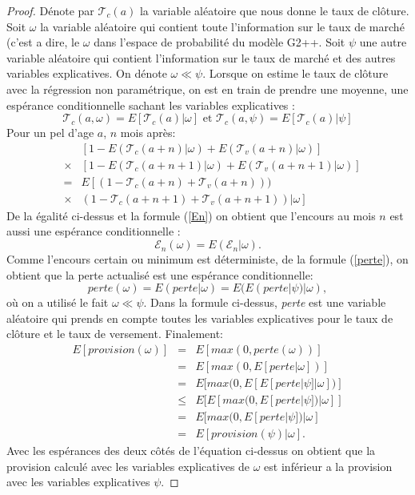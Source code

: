 \documentclass[12pt, a4paper]{book}
\newcommand{\Tc}{\mathcal{T}_c}
\newcommand{\Tv}{\mathcal{T}_v}
\newcommand{\E}{\mathcal{E}}
\begin{document}
{\begin{proof}
Dénote par $\Tc(a)$ la variable aléatoire que nous donne le taux de clôture. Soit $\omega$ la variable aléatoire qui contient toute l'information sur le taux de marché (c'est a dire, le $\omega$ dans l'espace de probabilité du modèle G2++. Soit $\psi$ une autre variable aléatoire qui contient l'information sur le taux de marché et des autres variables explicatives. On dénote $\omega \ll\psi$. Lorsque on estime le taux de clôture avec la régression non paramétrique, on est en train de prendre une moyenne, une espérance conditionnelle sachant les variables explicatives :
$$\Tc(a,\omega) = E[\Tc(a)|\omega]\mbox{ et } \Tc(a,\psi) = E[\Tc(a)|\psi]$$
Pour un pel d'age $a$, $n$ mois après:
\begin{eqnarray}
&&\left[1-E(\Tc(a+n)|\omega)+E(\Tv(a+n)|\omega)\right]\nonumber\\
&\times&\left[1-E(\Tc(a+n+1)|\omega)+E(\Tv(a+n+1)|\omega)\right]\nonumber\\
&=&E\left[\left(1-\Tc(a+n)+\Tv(a+n)\right)\right.)\nonumber\\
&\times&\left.\left(1-\Tc(a+n+1)+\Tv(a+n+1)\right)|\omega\right]\nonumber
\end{eqnarray}
De la égalité ci-dessus et la formule (\ref{En}) on obtient que l'encours au mois $n$ est aussi une espérance conditionnelle :
$$\E_n(\omega) = E(\E_n|\omega).$$
Comme l'encours certain ou minimum est déterministe, de la formule (\ref{perte}), on obtient que la perte actualisé est une espérance conditionnelle:
$$ perte(\omega) = E(perte| \omega)= E(E(perte|\psi)|\omega),$$
où on a utilisé le fait $\omega\ll \psi$.
Dans la formule ci-dessus, {\it perte} est une variable aléatoire qui prends en compte toutes les variables explicatives pour le taux de clôture et le taux de versement.
Finalement:
\begin{eqnarray}
E[provision(\omega)]&=&E[max(0,perte(\omega))]\nonumber\\
&=& E[max(0,E[perte|\omega])] \nonumber\\
&=& E[max(0,E[E[perte|\psi]|\omega])] \nonumber\\
&\leq& E[E[max(0,E[perte|\psi])|\omega]]\nonumber\\
&=& E[max(0,E[perte|\psi])|\omega] \nonumber\\
&=&E[provision(\psi)|\omega].\nonumber
\end{eqnarray}
Avec les espérances des deux côtés de l'équation ci-dessus on obtient que la provision calculé avec les variables explicatives de $\omega$ est inférieur a la provision avec les variables explicatives $\psi$.


\end{proof}}
\end{document}
